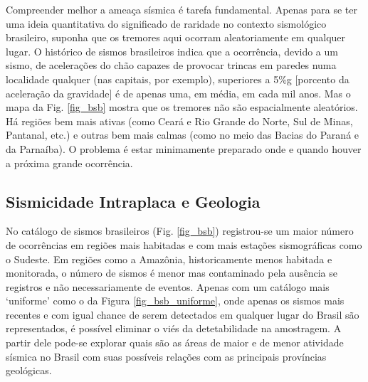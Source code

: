 \documentclass[jgrga]{agutex}
\begin{document}
\begin{article}
Compreender melhor a ameaça sísmica é tarefa fundamental. Apenas para se ter uma ideia quantitativa do significado de raridade no contexto sismológico brasileiro, suponha que os tremores aqui ocorram aleatoriamente em qualquer lugar. O histórico de sismos brasileiros indica que a ocorrência, devido a um sismo, de acelerações do chão capazes de provocar trincas em paredes numa localidade qualquer (nas capitais, por exemplo), superiores a 5\%g [porcento da aceleração da gravidade] é de apenas uma, em média, em cada mil anos. Mas o mapa da Fig. \ref{fig_bsb} mostra que os tremores não são espacialmente aleatórios. Há regiões bem mais ativas (como Ceará e Rio Grande do Norte, Sul de Minas, Pantanal, etc.) e outras bem mais calmas (como no meio das Bacias do Paraná e da Parnaíba). O problema é estar minimamente preparado onde e quando houver a próxima grande ocorrência.

\subsection{Sismicidade Intraplaca e Geologia}
No catálogo de sismos brasileiros (Fig. \ref{fig_bsb}) registrou-se um maior número de ocorrências em regiões mais habitadas e com mais estações sismográficas como o Sudeste. Em regiões como a Amazônia, historicamente menos habitada e monitorada, o número de sismos é menor mas contaminado pela ausência se registros e não necessariamente de eventos. Apenas com um catálogo mais ‘uniforme’ como o da Figura \ref{fig_bsb_uniforme}, onde apenas os sismos mais recentes e com igual chance de serem detectados em qualquer lugar do Brasil são representados, é possível eliminar o viés da detetabilidade na amostragem. A partir dele pode-se explorar quais são as áreas de maior e de menor atividade sísmica no Brasil com suas possíveis relações com as principais províncias geológicas.


\end{article}
\end{document}
